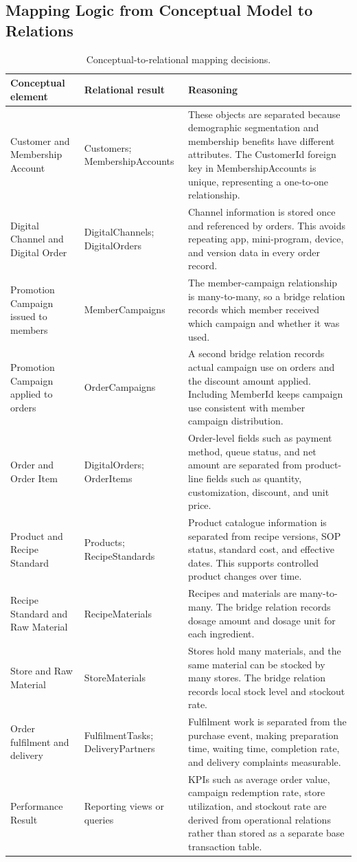 \documentclass[12pt,a4paper]{article}
\begin{document}
\subsection{Mapping Logic from Conceptual Model to Relations}

\begin{table}[H]
\centering
\caption{Conceptual-to-relational mapping decisions.}
\small
\begin{tabularx}{\textwidth}{P{4.0cm}P{3.2cm}Y}
\toprule
\textbf{Conceptual element} & \textbf{Relational result} & \textbf{Reasoning} \\
\midrule
Customer and Membership Account & Customers; MembershipAccounts & These objects are separated because demographic segmentation and membership benefits have different attributes. The CustomerId foreign key in MembershipAccounts is unique, representing a one-to-one relationship. \\
Digital Channel and Digital Order & DigitalChannels; DigitalOrders & Channel information is stored once and referenced by orders. This avoids repeating app, mini-program, device, and version data in every order record. \\
Promotion Campaign issued to members & MemberCampaigns & The member-campaign relationship is many-to-many, so a bridge relation records which member received which campaign and whether it was used. \\
Promotion Campaign applied to orders & OrderCampaigns & A second bridge relation records actual campaign use on orders and the discount amount applied. Including MemberId keeps campaign use consistent with member campaign distribution. \\
Order and Order Item & DigitalOrders; OrderItems & Order-level fields such as payment method, queue status, and net amount are separated from product-line fields such as quantity, customization, discount, and unit price. \\
Product and Recipe Standard & Products; RecipeStandards & Product catalogue information is separated from recipe versions, SOP status, standard cost, and effective dates. This supports controlled product changes over time. \\
Recipe Standard and Raw Material & RecipeMaterials & Recipes and materials are many-to-many. The bridge relation records dosage amount and dosage unit for each ingredient. \\
Store and Raw Material & StoreMaterials & Stores hold many materials, and the same material can be stocked by many stores. The bridge relation records local stock level and stockout rate. \\
Order fulfilment and delivery & FulfilmentTasks; DeliveryPartners & Fulfilment work is separated from the purchase event, making preparation time, waiting time, completion rate, and delivery complaints measurable. \\
Performance Result & Reporting views or queries & KPIs such as average order value, campaign redemption rate, store utilization, and stockout rate are derived from operational relations rather than stored as a separate base transaction table. \\
\bottomrule
\end{tabularx}
\end{table}
\end{document}
